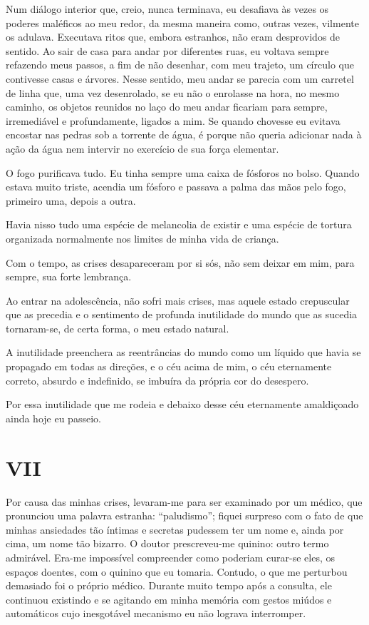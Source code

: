 Num diálogo interior que, creio, nunca terminava, eu desafiava às vezes os poderes maléficos ao meu redor, da mesma maneira como, outras vezes, vilmente os adulava. Executava ritos que, embora estranhos, não eram desprovidos de sentido. Ao sair de casa para andar por diferentes ruas, eu voltava sempre refazendo meus passos, a fim de não desenhar, com meu trajeto, um círculo que contivesse casas e árvores. Nesse sentido, meu andar se parecia com um carretel de linha que, uma vez desenrolado, se eu não o enrolasse na hora, no mesmo caminho, os objetos reunidos no laço do meu andar ficariam para sempre, irremediável e profundamente, ligados a mim. Se quando chovesse eu evitava encostar nas pedras sob a torrente de água, é porque não queria adicionar nada à ação da água nem intervir no exercício de sua força elementar.

O fogo purificava tudo. Eu tinha sempre uma caixa de fósforos no bolso. Quando estava muito triste, acendia um fósforo e passava a palma das mãos pelo fogo, primeiro uma, depois a outra.

Havia nisso tudo uma espécie de melancolia de existir e uma espécie de tortura organizada normalmente nos limites de minha vida de criança.

Com o tempo, as crises desapareceram por si sós, não sem deixar em mim, para sempre, sua forte lembrança.

Ao entrar na adolescência, não sofri mais crises, mas aquele estado crepuscular que as precedia e o sentimento de profunda inutilidade do mundo que as sucedia tornaram-se, de certa forma, o meu estado natural.

A inutilidade preenchera as reentrâncias do mundo como um líquido que havia se propagado em todas as direções, e o céu acima de mim, o céu eternamente correto, absurdo e indefinido, se imbuíra da própria cor do desespero. 

Por essa inutilidade que me rodeia e debaixo desse céu eternamente amaldiçoado ainda hoje eu passeio.


\chapter*{\centering\Large{VII}}

Por causa das minhas crises, levaram-me para ser examinado por um médico, que pronunciou uma palavra estranha: ``paludismo''; fiquei surpreso com o fato de que minhas ansiedades tão íntimas e secretas pudessem ter um nome e, ainda por cima, um nome tão bizarro. O doutor prescreveu-me quinino: outro termo admirável. Era-me impossível compreender como poderiam curar-se eles, os espaços doentes, com o quinino que eu tomaria. Contudo, o que me perturbou demasiado foi o próprio médico. Durante muito tempo após a consulta, ele continuou existindo e se agitando em minha memória com gestos miúdos e automáticos cujo inesgotável mecanismo eu não lograva interromper.

